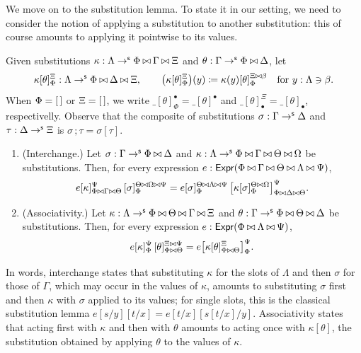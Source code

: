 We move on to the substitution lemma. To state it in our setting, we need to consider the notion of applying a substitution to another substitution: this of course amounts to applying it pointwise to its values.

\begin{definition} 
    Given substitutions $\kappa : \Lambda \to^{\mathsf{s}} \Phi \mathbin{\bowtie} \Gamma \mathbin{\bowtie} \Xi$ and $\theta : \Gamma \to^{\mathsf{s}} \Phi \mathbin{\bowtie} \Delta$, let
    \[
        \kappa[\theta]_\Phi^\Xi : \Lambda \to^{\mathsf{s}} \Phi \mathbin{\bowtie} \Delta \mathbin{\bowtie} \Xi, \qquad
        \big(\kappa[\theta]_\Phi^\Xi\big)(y) \coloneqq \kappa(y)[\theta]_\Phi^{\Xi \mathbin{\bowtie} \beta} \quad \text{for } y : \Lambda \ni \beta.
        \]
        When $\Phi = \left[\,\right]$ or $\Xi = \left[\,\right]$, we write $\_[\theta]_{\Phi}^{\bullet} = \_[\theta]^{\bullet}$ and $\_[\theta]^{\Xi}_{\bullet} = \_[\theta]_{\bullet}$, respectivelly. Observe that the composite of substitutions $\sigma : \Gamma \to^{\mathsf{s}} \Delta$ and $\tau : \Delta \to^{\mathsf{s}} \Xi$ is $\sigma \,; \tau = \sigma[\tau]$.
\end{definition}
        
\begin{lemma}\label{lem:substitution}
    \begin{enumerate}
        \item (Interchange.) Let $\sigma : \Gamma \to^{\mathsf{s}} \Phi \mathbin{\bowtie} \Delta$ and $\kappa : \Lambda \to^{\mathsf{s}} \Phi \mathbin{\bowtie} \Gamma \mathbin{\bowtie} \Theta \mathbin{\bowtie} \Omega$ be substitutions. Then, for every expression $e : \mathsf{Expr}(\Phi \mathbin{\bowtie} \Gamma \mathbin{\bowtie} \Theta \mathbin{\bowtie} \Lambda \mathbin{\bowtie} \Psi)$,
        \[
        e[\kappa]_{\Phi \mathbin{\bowtie} \Gamma \mathbin{\bowtie} \Theta}^{\Psi}\,[\sigma]_\Phi^{\Theta \mathbin{\bowtie} \Omega \mathbin{\bowtie} \Psi}
        = e[\sigma]_\Phi^{\Theta \mathbin{\bowtie} \Lambda \mathbin{\bowtie} \Psi}\,\big[\kappa[\sigma]_\Phi^{\Theta \mathbin{\bowtie} \Omega}\big]_{\Phi \mathbin{\bowtie} \Delta \mathbin{\bowtie} \Theta}^{\Psi}.
        \]
        \item (Associativity.) Let $\kappa : \Lambda \to^{\mathsf{s}} \Phi \mathbin{\bowtie} \Theta \mathbin{\bowtie} \Gamma \mathbin{\bowtie} \Xi$ and $\theta : \Gamma \to^{\mathsf{s}} \Phi \mathbin{\bowtie} \Theta \mathbin{\bowtie} \Delta$ be substitutions. Then, for every expression $e : \mathsf{Expr}(\Phi \mathbin{\bowtie} \Lambda \mathbin{\bowtie} \Psi)$,
        \[
        e[\kappa]_\Phi^\Psi\,[\theta]_{\Phi \mathbin{\bowtie} \Theta}^{\Xi \mathbin{\bowtie} \Psi}
        = e\big[\kappa[\theta]_{\Phi \mathbin{\bowtie} \Theta}^{\Xi}\big]_\Phi^\Psi.
        \]
    \end{enumerate}
\end{lemma}

In words, interchange states that substituting $\kappa$ for the slots of $\Lambda$ and then $\sigma$ for those of $\Gamma$, which may occur in the values of $\kappa$, amounts to substituting $\sigma$ first and then $\kappa$ with $\sigma$ applied to its values; for single slots, this is the classical substitution lemma $e[s/y][t/x] = e[t/x][s[t/x]/y]$. Associativity states that acting first with $\kappa$ and then with $\theta$ amounts to acting once with $\kappa[\theta]$, the substitution obtained by applying $\theta$ to the values of $\kappa$.

